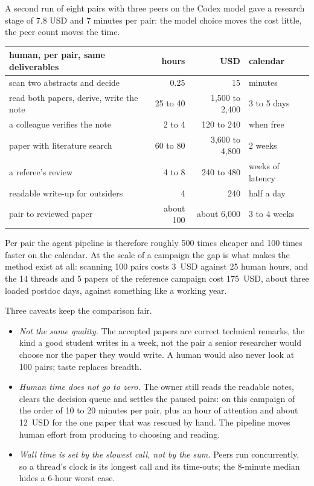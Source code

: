 \documentclass[11pt,a4paper]{article}
\begin{document}
A second run of eight pairs with three peers on the Codex model gave a
research stage of 7.8 USD and 7 minutes per pair: the model choice moves
the cost little, the peer count moves the time.

\begin{center}
\small
\begin{tabularx}{\textwidth}{@{}Xrrl@{}}
\toprule
human, per pair, same deliverables & hours & USD & calendar \\
\midrule
scan two abstracts and decide & 0.25 & 15 & minutes \\
read both papers, derive, write the note & 25 to 40 & 1,500 to 2,400 & 3 to 5 days \\
a colleague verifies the note & 2 to 4 & 120 to 240 & when free \\
paper with literature search & 60 to 80 & 3,600 to 4,800 & 2 weeks \\
a referee's review & 4 to 8 & 240 to 480 & weeks of latency \\
readable write-up for outsiders & 4 & 240 & half a day \\
\midrule
pair to reviewed paper & about 100 & about 6,000 & 3 to 4 weeks \\
\bottomrule
\end{tabularx}
\end{center}

Per pair the agent pipeline is therefore roughly 500 times cheaper and 100
times faster on the calendar. At the scale of a campaign the gap is what
makes the method exist at all: scanning 100 pairs costs 3~USD against 25
human hours, and the 14 threads and 5 papers of the reference campaign cost
175~USD, about three loaded postdoc days, against something like a working
year.

Three caveats keep the comparison fair.
\begin{itemize}\setlength{\itemsep}{1pt}
  \item \emph{Not the same quality.} The accepted papers are correct
    technical remarks, the kind a good student writes in a week, not the
    pair a senior researcher would choose nor the paper they would write.
    A human would also never look at 100 pairs; taste replaces breadth.
  \item \emph{Human time does not go to zero.} The owner still reads the
    readable notes, clears the decision queue and settles the paused
    pairs: on this campaign of the order of 10 to 20 minutes per pair, plus
    an hour of attention and about 12~USD for the one paper that was
    rescued by hand. The pipeline moves human effort from producing to
    choosing and reading.
  \item \emph{Wall time is set by the slowest call, not by the sum.} Peers
    run concurrently, so a thread's clock is its longest call and its
    time-outs; the 8-minute median hides a 6-hour worst case.
\end{itemize}
\end{document}
